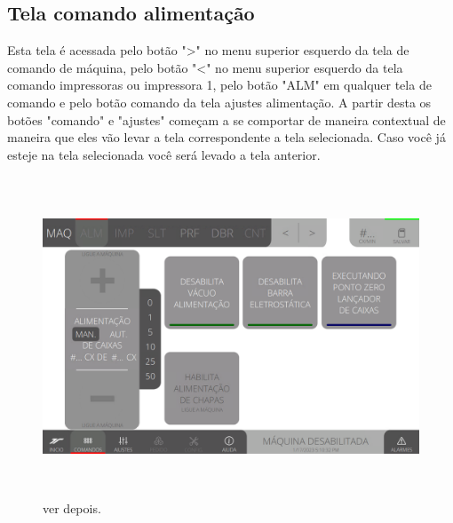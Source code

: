 \newpage
\thispagestyle{fancy}
\vspace*{\fill}
\subsection{Tela comando alimentação}
 Esta tela é acessada pelo botão "\textgreater" no menu superior esquerdo da tela de comando de máquina, pelo botão "\textless{}" no menu superior esquerdo da tela comando impressoras ou impressora 1, pelo botão "ALM" em qualquer tela de comando e pelo botão comando da tela ajustes alimentação. A partir desta os botões "comando" e "ajustes" começam a se comportar de maneira contextual de maneira que eles vão levar a tela correspondente a tela selecionada. Caso você já esteje na tela selecionada você será levado a tela anterior.
\begin{figure}[h]
  \centering
  \includegraphics[width=576px,height=360px]{src/imagesFlexo/03-feeder/commands/e-Tela-Principal.png}
  \caption{ver depois.}
   \label{}
\end{figure}

\newpage
\thispagestyle{fancy}
\vspace*{\fill}
